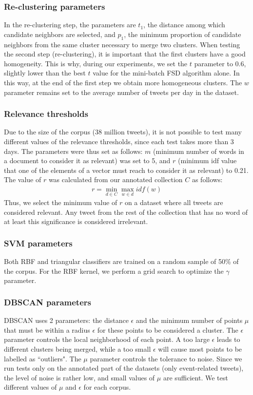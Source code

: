 \subsubsection{Re-clustering parameters}
In the re-clustering step, the parameters are $t_1$, the distance among which candidate neighbors are selected, and $p_1$, the minimum proportion of candidate neighbors from the same cluster necessary to merge two clusters.
When testing the second step (re-clustering), it is important that the first clusters have a good homogeneity. This is why, during our experiments, we set the $t$ parameter to 0.6, slightly lower than the best $t$ value for the mini-batch FSD algorithm alone. In this way, at the end of the first step we obtain more homogeneous clusters. The $w$ parameter remains set to the average number of tweets per day in the dataset.

\subsubsection{Relevance thresholds}
Due to the size of the corpus (38 million tweets), it is not possible to test many different values of the relevance thresholds, since each test takes more than 3 days. The parameters were thus set as follows: $m$ (minimum number of words in a document to consider it as relevant) was set to 5, and $r$ (minimum idf value that one of the elements of a vector must reach to consider it as relevant) to 0.21. The value of $r$ was calculated from our annotated collection $C$ as follows: 
\begin{align*}
r = \min_{d \in C}\max_{w \in d}idf(w)
\end{align*}
Thus, we select the minimum value of $r$ on a dataset where all tweets are considered relevant. Any tweet from the rest of the collection that has no word of at least this significance is considered irrelevant.

\subsubsection{SVM parameters}
Both RBF and triangular classifiers are trained on a random sample of 50\% of the corpus. For the RBF kernel, we perform a grid search to optimize the $\gamma$ parameter. 

\subsubsection{DBSCAN parameters}
DBSCAN uses 2 parameters: the distance $\epsilon$ and the minimum number of points $\mu$ that must be within a radius $\epsilon$ for these points to be considered a cluster. The $\epsilon$ parameter controls the local neighborhood of each point. A too large $\epsilon$ leads to different clusters being merged, while a too small $\epsilon$ will cause most points to be labelled as ``outliers". The $\mu$ parameter controls the tolerance to noise. Since we run tests only on the annotated part of the datasets (only event-related tweets), the level of noise is rather low, and small values of $\mu$ are sufficient. We test different values of $\mu$ and $\epsilon$ for each corpus.

